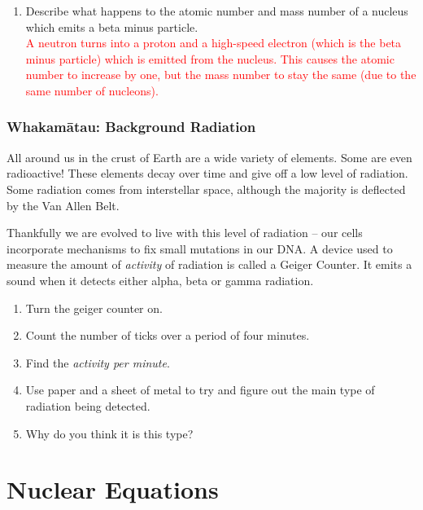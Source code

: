 \documentclass[12pt]{report}
\makeatletter
\DeclareRobustCommand{\StudentVSpace}[2]{%
	\ifthenelse{\boolean{@answer}}
	{\textcolor{red}{\\#1}}
	{\vspace{#2}}
}
\makeatother
\begin{document}
\begin{enumerate}
\begin{figure}[ht]
    \end{figure}
	\item Describe what happens to the atomic number and mass number of a nucleus which emits a beta minus particle.
	\StudentVSpace{A neutron turns into a proton and a high-speed electron (which is the beta minus particle) which is emitted from the nucleus. This causes the atomic number to increase by one, but the mass number to stay the same (due to the same number of nucleons).}{1.5cm}
\end{enumerate}

\newpage
\subsection{Whakamātau: Background Radiation}
All around us in the crust of Earth are a wide variety of elements. Some are even radioactive! These elements decay over time and give off a low level of radiation. Some radiation comes from interstellar space, although the majority is deflected by the Van Allen Belt.

 Thankfully we are evolved to live with this level of radiation -- our cells incorporate mechanisms to fix small mutations in our DNA. A device used to measure the amount of \textit{activity} of radiation is called a Geiger Counter. It emits a sound when it detects either alpha, beta or gamma radiation.

\begin{enumerate}
	\item Turn the geiger counter on.
	\item Count the number of ticks over a period of four minutes.\vspace{0.5cm}
	\item Find the \textit{activity per minute}.\vspace{0.5cm}
	\item Use paper and a sheet of metal to try and figure out the main type of radiation being detected.\vspace{1.5cm}
	\item Why do you think it is this type?\vspace{1cm}
\end{enumerate}


\newpage
\chapter{Nuclear Equations}
\end{document}
